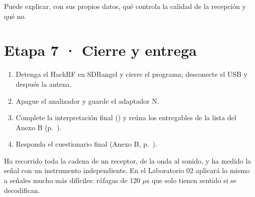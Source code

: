 \begin{logro}
Puede explicar, con sus propios datos, qué controla la calidad de la recepción y qué no.
\end{logro}

\section{Etapa 7 · Cierre y entrega}
\label{sec:w-evid}

\begin{enumerate}
  \item Detenga el HackRF en SDRangel y cierre el programa; desconecte el USB y después la antena.
  \item Apague el analizador y guarde el adaptador N.
  \item Complete la interpretación final () y reúna los entregables de la lista del Anexo B (p.~\pageref{B-sec:b-entregaw}).
  \item Responda el cuestionario final (Anexo B, p.~\pageref{B-sec:b-finalw}).
\end{enumerate}

\begin{logro}
Ha recorrido toda la cadena de un receptor, de la onda al sonido, y ha medido la señal con un instrumento independiente. En el Laboratorio 02 aplicará lo mismo a señales mucho más difíciles: ráfagas de 120 $\mu$s que solo tienen sentido si se decodifican.
\end{logro}
